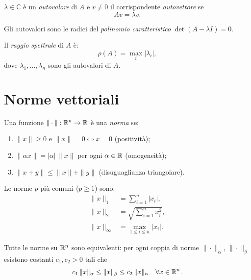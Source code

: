 \begin{definition}
$\lambda \in \mathbb{C}$ è un \emph{autovalore} di $A$ e $v \neq 0$ il corrispondente
\emph{autovettore} se
\begin{equation}
  Av = \lambda v.
  \label{eq:autovalore}
\end{equation}
\end{definition}

Gli autovalori sono le radici del \emph{polinomio caratteristico} $\det(A - \lambda I) = 0$.

\begin{definition}
Il \emph{raggio spettrale} di $A$ è:
\begin{equation}
  \rho(A) = \max_i |\lambda_i|,
  \label{eq:raggio_spettrale}
\end{equation}
dove $\lambda_1, \ldots, \lambda_n$ sono gli autovalori di $A$.
\end{definition}

\section{Norme vettoriali}
\label{sec:norme_vettoriali}

\begin{definition}
Una funzione $\|\cdot\| : \mathbb{R}^n \to \mathbb{R}$ è una \emph{norma} se:
\begin{enumerate}
  \item $\|x\| \geq 0$ e $\|x\| = 0 \iff x = 0$ \quad (positività);
  \item $\|\alpha x\| = |\alpha|\,\|x\|$ per ogni $\alpha \in \mathbb{R}$ \quad (omogeneità);
  \item $\|x + y\| \leq \|x\| + \|y\|$ \quad (disuguaglianza triangolare).
\end{enumerate}
\end{definition}

Le norme $p$ più comuni ($p \geq 1$) sono:
\begin{align}
  \|x\|_1   &= \sum_{i=1}^n |x_i|, \label{eq:norma1}\\
  \|x\|_2   &= \sqrt{\sum_{i=1}^n x_i^2}, \label{eq:norma2}\\
  \|x\|_\infty &= \max_{1 \leq i \leq n} |x_i|. \label{eq:normaInf}
\end{align}

\begin{theorem}
Tutte le norme su $\mathbb{R}^n$ sono equivalenti: per ogni coppia di norme
$\|\cdot\|_\alpha$, $\|\cdot\|_\beta$ esistono costanti $c_1, c_2 > 0$ tali che
\begin{equation}
  c_1\,\|x\|_\alpha \leq \|x\|_\beta \leq c_2\,\|x\|_\alpha \quad \forall x \in \mathbb{R}^n.
\end{equation}
\end{theorem}

